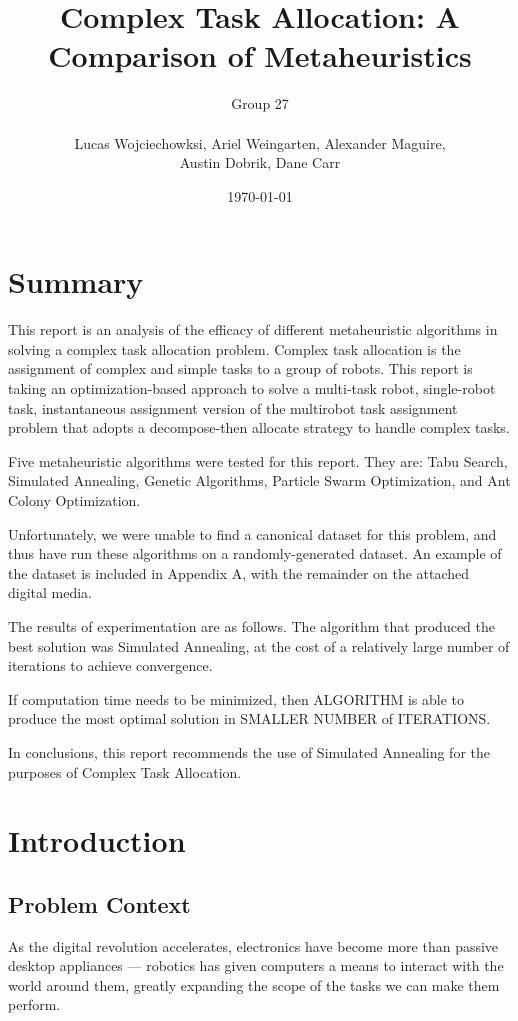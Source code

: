 \documentclass[a4paper]{article}
\title{Complex Task Allocation: A Comparison of Metaheuristics}
\author{
	Group 27 \\
	\\
	Lucas Wojciechowksi, Ariel Weingarten, Alexander Maguire, \\
	Austin Dobrik, Dane Carr}
\date{\today}
\begin{document}
\maketitle

\section*{Summary}
This report is an analysis of the efficacy of different metaheuristic algorithms in solving a complex task allocation problem.
Complex task allocation is the assignment of complex and simple tasks to a group of robots. This report is taking an optimization-based approach to solve a multi-task robot, single-robot task, instantaneous assignment version of the multirobot task assignment problem that adopts a decompose-then allocate strategy to handle complex tasks.

Five metaheuristic algorithms were tested for this report. They are: Tabu Search, Simulated Annealing, Genetic Algorithms, Particle Swarm Optimization, and Ant Colony Optimization.

Unfortunately, we were unable to find a canonical dataset for this problem, and thus have run these algorithms on a randomly-generated dataset. An example of the dataset is included in Appendix A, with the remainder on the attached digital media.

The results of experimentation are as follows. The algorithm that produced the best solution was Simulated Annealing, at the cost of a relatively large number of iterations to achieve convergence.

If computation time needs to be minimized, then ALGORITHM is able to produce the most optimal solution in SMALLER NUMBER of ITERATIONS.

In conclusions, this report recommends the use of Simulated Annealing for the purposes of Complex Task Allocation.

\section{Introduction}
\subsection{Problem Context}

As the digital revolution accelerates, electronics have become more than passive desktop appliances --- robotics has given computers a means to interact with the world around them, greatly expanding the scope of the tasks we can make them perform.
\end{document}
